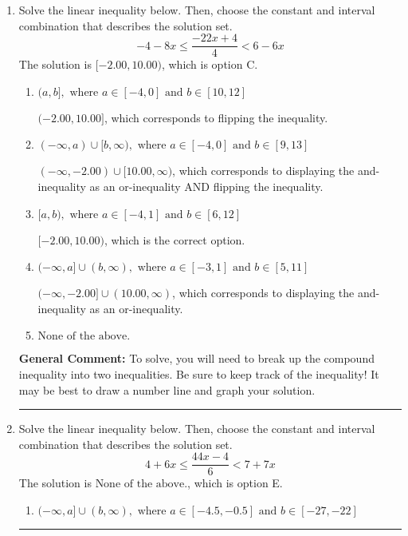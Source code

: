 \documentclass{extbook}[14pt]
\newcommand{\litem}[1]{\item #1

\rule{\textwidth}{0.4pt}}
\begin{document}
\begin{enumerate}
{\begin{enumerate}[label=\Alph*.]
You may have chosen this if you thought the inequality did not match the ends of the intervals.
\end{enumerate}

\textbf{General Comment:} Remember that less/greater than or equal to includes the endpoint, while less/greater do not. Also, remember that you need to flip the inequality when you multiply or divide by a negative.
}
\litem{
Solve the linear inequality below. Then, choose the constant and interval combination that describes the solution set.
\[ -4 - 8 x \leq \frac{-22 x + 4}{4} < 6 - 6 x \]
The solution is \( [-2.00, 10.00) \), which is option C.\begin{enumerate}[label=\Alph*.]
\item \( (a, b], \text{ where } a \in [-4, 0] \text{ and } b \in [10, 12] \)

$(-2.00, 10.00]$, which corresponds to flipping the inequality.
\item \( (-\infty, a) \cup [b, \infty), \text{ where } a \in [-4, 0] \text{ and } b \in [9, 13] \)

$(-\infty, -2.00) \cup [10.00, \infty)$, which corresponds to displaying the and-inequality as an or-inequality AND flipping the inequality.
\item \( [a, b), \text{ where } a \in [-4, 1] \text{ and } b \in [6, 12] \)

$[-2.00, 10.00)$, which is the correct option.
\item \( (-\infty, a] \cup (b, \infty), \text{ where } a \in [-3, 1] \text{ and } b \in [5, 11] \)

$(-\infty, -2.00] \cup (10.00, \infty)$, which corresponds to displaying the and-inequality as an or-inequality.
\item \( \text{None of the above.} \)


\end{enumerate}

\textbf{General Comment:} To solve, you will need to break up the compound inequality into two inequalities. Be sure to keep track of the inequality! It may be best to draw a number line and graph your solution.
}
\litem{
Solve the linear inequality below. Then, choose the constant and interval combination that describes the solution set.
\[ 4 + 6 x \leq \frac{44 x - 4}{6} < 7 + 7 x \]
The solution is \( \text{None of the above.} \), which is option E.\begin{enumerate}[label=\Alph*.]
\item \( (-\infty, a] \cup (b, \infty), \text{ where } a \in [-4.5, -0.5] \text{ and } b \in [-27, -22] \)


\end{enumerate}}
\end{enumerate}
\end{document}
